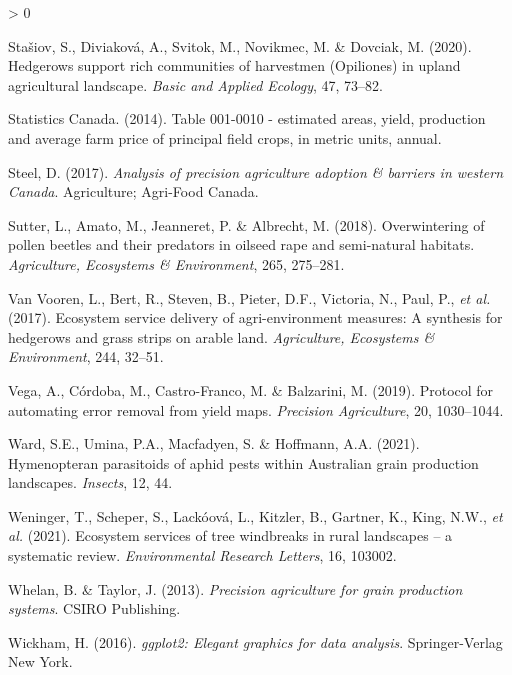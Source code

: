 \documentclass[]{elsarticle} %
\newlength{\cslhangindent}
\newenvironment{CSLReferences}[2] %
 {%
  \setlength{\parindent}{0pt}
  \ifodd #1 \everypar{\setlength{\hangindent}{\cslhangindent}}\ignorespaces\fi
  \ifnum #2 > 0
  \setlength{\parskip}{#2\baselineskip}
  \fi
 }%
 {}
\begin{document}
\begin{CSLReferences}{1}{0}
\leavevmode\hypertarget{ref-stasiov2020}{}%
Stašiov, S., Diviaková, A., Svitok, M., Novikmec, M. \& Dovciak, M. (2020). Hedgerows support rich communities of harvestmen ({Opiliones}) in upland agricultural landscape. \emph{Basic and Applied Ecology}, 47, 73--82.

\leavevmode\hypertarget{ref-statscan_canola2014}{}%
Statistics Canada. (2014). Table 001-0010 - estimated areas, yield, production and average farm price of principal field crops, in metric units, annual.

\leavevmode\hypertarget{ref-steel2017}{}%
Steel, D. (2017). \emph{Analysis of precision agriculture adoption \& barriers in western {Canada}}. Agriculture; Agri-Food Canada.

\leavevmode\hypertarget{ref-sutter2018b}{}%
Sutter, L., Amato, M., Jeanneret, P. \& Albrecht, M. (2018). Overwintering of pollen beetles and their predators in oilseed rape and semi-natural habitats. \emph{Agriculture, Ecosystems {\&} Environment}, 265, 275--281.

\leavevmode\hypertarget{ref-vanVooren2017}{}%
Van Vooren, L., Bert, R., Steven, B., Pieter, D.F., Victoria, N., Paul, P., \emph{et al.} (2017). Ecosystem service delivery of agri-environment measures: A synthesis for hedgerows and grass strips on arable land. \emph{Agriculture, Ecosystems {\&} Environment}, 244, 32--51.

\leavevmode\hypertarget{ref-vega2019}{}%
Vega, A., Córdoba, M., Castro-Franco, M. \& Balzarini, M. (2019). Protocol for automating error removal from yield maps. \emph{Precision Agriculture}, 20, 1030--1044.

\leavevmode\hypertarget{ref-ward2021}{}%
Ward, S.E., Umina, P.A., Macfadyen, S. \& Hoffmann, A.A. (2021). Hymenopteran parasitoids of aphid pests within {Australian} grain production landscapes. \emph{Insects}, 12, 44.

\leavevmode\hypertarget{ref-weninger2021}{}%
Weninger, T., Scheper, S., Lackóová, L., Kitzler, B., Gartner, K., King, N.W., \emph{et al.} (2021). Ecosystem services of tree windbreaks in rural landscapes -- a systematic review. \emph{Environmental Research Letters}, 16, 103002.

\leavevmode\hypertarget{ref-whelan2013}{}%
Whelan, B. \& Taylor, J. (2013). \emph{Precision agriculture for grain production systems}. CSIRO Publishing.

\leavevmode\hypertarget{ref-wickham2016}{}%
Wickham, H. (2016). \emph{{ggplot2}: Elegant graphics for data analysis}. Springer-Verlag New York.


\end{CSLReferences}
\end{document}
